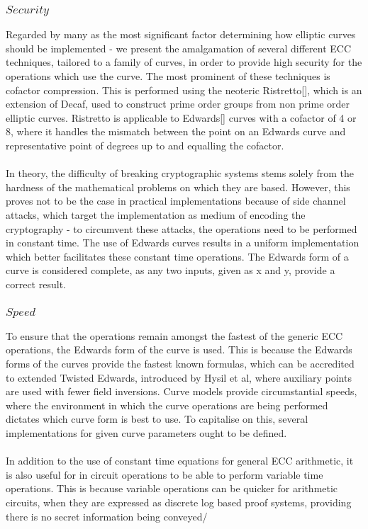\documentclass{article}
\begin{document}
\subsubsection{$Security$}  Regarded by many as the most significant factor determining how elliptic curves should be implemented - we present the amalgamation of several different ECC techniques, tailored to a family of curves, in order to provide high security for the operations which use the curve. The most prominent of these techniques is cofactor compression. This is performed using the neoteric Ristretto[], which is an extension of Decaf, used to construct prime order groups from non prime order elliptic curves. Ristretto is applicable to Edwards[] curves with a cofactor of 4 or 8, where it handles the mismatch between the point on an Edwards curve and representative point of degrees up to and equalling the cofactor. \\\\
 In theory, the difficulty of breaking cryptographic systems stems solely from the hardness of the mathematical problems on which they are based. However, this proves not to be the case in practical implementations because of side channel attacks, which target the implementation as medium of encoding the cryptography - to circumvent these attacks, the operations need to be performed in constant time. The use of Edwards curves results in a uniform implementation which better facilitates these constant time operations. The Edwards form of a curve is considered complete, as any two inputs, given as x and y, provide a correct result.   
\subsubsection{$Speed$} To ensure that the operations remain amongst the fastest of the generic ECC operations, the Edwards form of the curve is used. This is because the Edwards forms of the curves provide the fastest known formulas, which can be accredited to extended Twisted Edwards, introduced by Hysil et al, where auxiliary points are used with fewer field inversions. Curve models provide circumstantial speeds, where the environment in which the curve operations are being performed dictates which curve form is best to use. To capitalise on this, several implementations for given curve parameters ought to be defined. \\\\
In addition to the use of constant time equations for general ECC arithmetic, it is also useful for in circuit operations to be able to perform variable time operations. This is because variable operations can be quicker for arithmetic circuits, when they are expressed as discrete log based proof systems, providing there is no secret information being conveyed/
\end{document}
